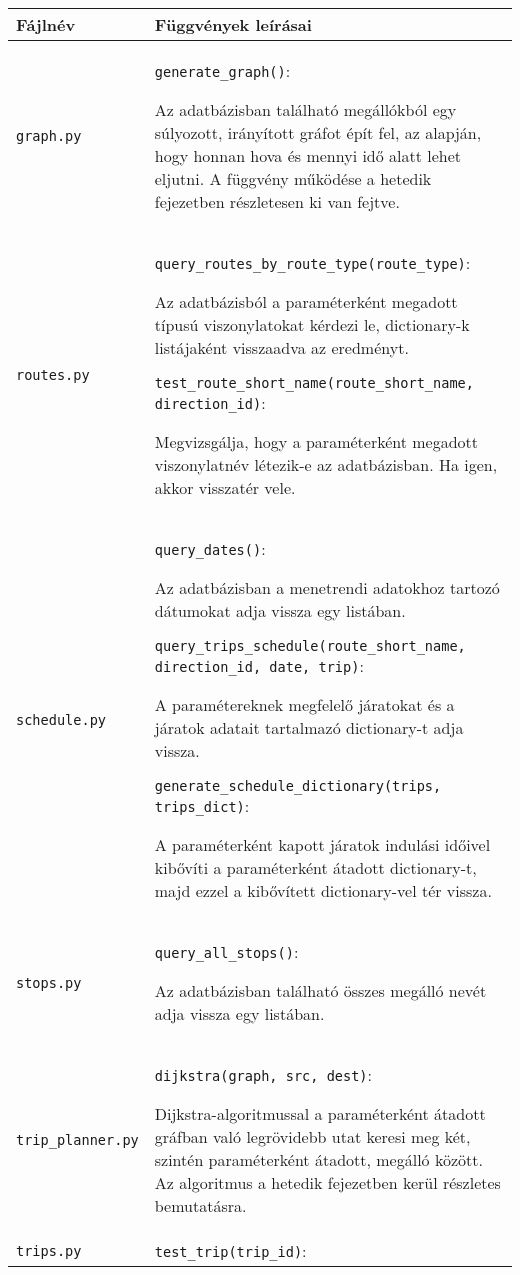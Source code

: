 \begin{longtable}{|p{4.5cm}|p{9cm}|}
\hline
\textbf{Fájlnév} & \textbf{Függvények leírásai} \\
\hline
\texttt{graph.py} &
\texttt{generate\_graph()}:

Az adatbázisban található megállókból egy súlyozott, irányított gráfot épít fel, az alapján, hogy honnan hova és mennyi idő alatt lehet eljutni. A függvény működése a hetedik fejezetben részletesen ki van fejtve.
\\
\hline
\texttt{routes.py} &
\texttt{query\_routes\_by\_route\_type(route\_type)}:

Az adatbázisból a paraméterként megadott típusú viszonylatokat kérdezi le, dictionary-k listájaként visszaadva az eredményt.

\bigskip

\texttt{test\_route\_short\_name(route\_short\_name, direction\_id)}:

Megvizsgálja, hogy a paraméterként megadott viszonylatnév létezik-e az adatbázisban. Ha igen, akkor visszatér vele.
\\
\hline
\texttt{schedule.py} &
\texttt{query\_dates()}:

Az adatbázisban a menetrendi adatokhoz tartozó dátumokat adja vissza egy listában.

\bigskip

\texttt{query\_trips\_schedule(route\_short\_name, direction\_id, date, trip)}:

A paramétereknek megfelelő járatokat és a járatok adatait tartalmazó dictionary-t adja vissza.

\bigskip

\texttt{generate\_schedule\_dictionary(trips, trips\_dict)}:

A paraméterként kapott járatok indulási időivel kibővíti a paraméterként átadott dictionary-t, majd ezzel a kibővített dictionary-vel tér vissza.
\\
\hline
\texttt{stops.py} &
\texttt{query\_all\_stops()}:

Az adatbázisban található összes megálló nevét adja vissza egy listában.
\\
\hline
\texttt{trip\_planner.py} &
\texttt{dijkstra(graph, src, dest)}:

Dijkstra-algoritmussal a paraméterként átadott gráfban való legrövidebb utat keresi meg két, szintén paraméterként átadott, megálló között. Az algoritmus a hetedik fejezetben kerül részletes bemutatásra.
\\
\hline
\texttt{trips.py} &
\texttt{test\_trip(trip\_id)}:


\end{longtable}
